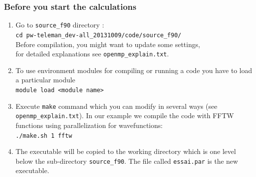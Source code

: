 \documentclass[10pt]{beamer}
\begin{document}
\begin{frame}
\frametitle{Before you start the calculations}
\begin{enumerate}  
\item Go to {\tt source\_f90} directory :\\
\vspace*{0.2cm}
{\tt cd pw-teleman\_dev-all\_20131009/code/source\_f90/
}\\
\vspace*{0.2cm}
Before compilation, you might want to update some settings,\\ for detailed explanations see {\tt openmp\_explain.txt}.
\vspace*{0.2cm}
\item To use environment modules for compiling or running a code you have to load a particular module\\
\vspace*{0.2cm}
{\tt module load <module name>}
\vspace*{0.2cm}
\item Execute {\tt make} command which you can modify in several ways (see {\tt openmp\_explain.txt}). In our example we compile the code with FFTW functions using parallelization for wavefunctions:\\
\vspace*{0.2cm}
{\tt ./make.sh 1 fftw} 
\vspace*{0.2cm}
\item The executable will be copied to the working
 directory which is one level below the sub-directory {\tt source\_f90}. The file called {\tt essai.par} is
 the new executable.
\end{enumerate} 
 

   
\end{frame}
\end{document}
